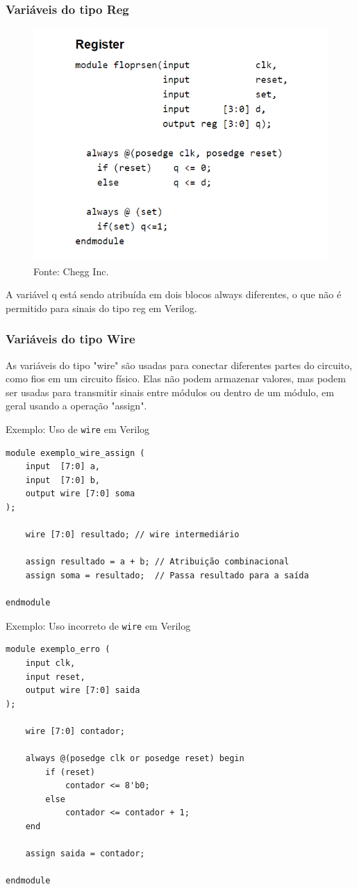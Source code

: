 \documentclass{beamer}
\begin{document}
\begin{frame}
\frametitle{Variáveis do tipo Reg}
\begin{figure}
    \centering
    \includegraphics[width=0.5\linewidth]{reg.png}
    \label{fig:enter-label}
    \\
    Fonte: Chegg Inc.
\end{figure}

A variável q está sendo atribuída em dois blocos always diferentes, o que não é permitido para sinais do tipo reg em Verilog.
\end{frame}


\begin{frame}
\frametitle{Variáveis do tipo Wire}
As variáveis do tipo "wire" são usadas para conectar diferentes partes do circuito, como fios em um circuito físico.
Elas não podem armazenar valores, mas podem ser usadas para transmitir sinais entre módulos ou dentro de um módulo, em geral usando a operação "assign".
\end{frame}

\begin{frame}[fragile]{Exemplo: Uso de \texttt{wire} em Verilog}
\small
\begin{verbatim}
module exemplo_wire_assign (
    input  [7:0] a,
    input  [7:0] b,
    output wire [7:0] soma
);

    wire [7:0] resultado; // wire intermediário

    assign resultado = a + b; // Atribuição combinacional
    assign soma = resultado;  // Passa resultado para a saída

endmodule
\end{verbatim}
\end{frame}

\begin{frame}[fragile]{Exemplo: Uso incorreto de \texttt{wire} em Verilog}
\small
\begin{verbatim}
module exemplo_erro (
    input clk,
    input reset,
    output wire [7:0] saida
);

    wire [7:0] contador;

    always @(posedge clk or posedge reset) begin
        if (reset)
            contador <= 8'b0;
        else
            contador <= contador + 1;
    end

    assign saida = contador;

endmodule
\end{verbatim}
\end{frame}
\end{document}
